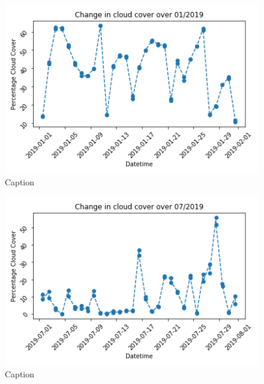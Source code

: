 \begin{figure}[h]
    \centering
    \includegraphics[totalheight=0.3\textheight]{cloud_percent_jan_southsea.png}
    \caption{Caption}
    \label{fig:cloud_pc_jan}
\end{figure}


\begin{figure}[h]
    \centering
    \includegraphics[totalheight=0.3\textheight]{cloud_percent_jul_southsea.png}
    \caption{Caption}
    \label{fig:cloud_pc_jul}
\end{figure}

